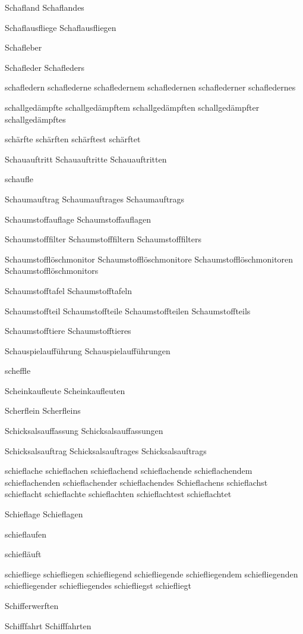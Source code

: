 Schafland
Schaflandes

Schaflausfliege
Schaflausfliegen

Schafleber

Schafleder
Schafleders

schafledern
schaflederne
schafledernem
schafledernen
schaflederner
schafledernes

schallgedämpfte
schallgedämpftem
schallgedämpften
schallgedämpfter
schallgedämpftes

schärfte
schärften
schärftest
schärftet

Schauauftritt
Schauauftritte
Schauauftritten

schaufle

Schaumauftrag
Schaumauftrages
Schaumauftrags

Schaumstoffauflage
Schaumstoffauflagen

Schaumstofffilter
Schaumstofffiltern
Schaumstofffilters

Schaumstofflöschmonitor
Schaumstofflöschmonitore
Schaumstofflöschmonitoren
Schaumstofflöschmonitors

Schaumstofftafel
Schaumstofftafeln

Schaumstoffteil
Schaumstoffteile
Schaumstoffteilen
Schaumstoffteils

Schaumstofftiere
Schaumstofftieres

Schauspielaufführung
Schauspielaufführungen

scheffle

Scheinkaufleute
Scheinkaufleuten

Scherflein
Scherfleins

Schicksalsauffassung
Schicksalsauffassungen

Schicksalsauftrag
Schicksalsauftrages
Schicksalsauftrags

schieflache
schieflachen
schieflachend
schieflachende
schieflachendem
schieflachenden
schieflachender
schieflachendes
Schieflachens
schieflachst
schieflacht
schieflachte
schieflachten
schieflachtest
schieflachtet

Schieflage
Schieflagen

schieflaufen

schiefläuft

schiefliege 
schiefliegen 
schiefliegend 
schiefliegende 
schiefliegendem 
schiefliegenden 
schiefliegender 
schiefliegendes 
schiefliegst 
schiefliegt

Schifferwerften

Schifffahrt
Schifffahrten

